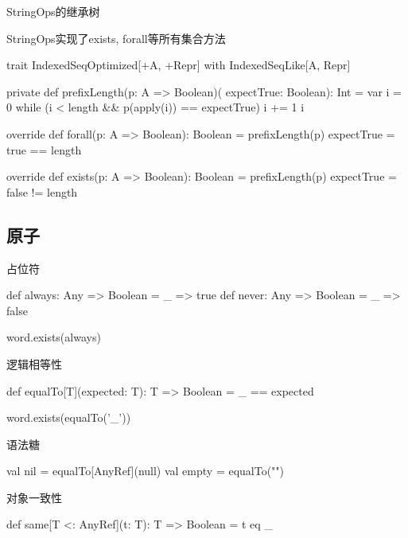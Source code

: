 \begin{frame}[fragile]{StringOps的继承树}
 \begin{block}{StringOps实现了exists, forall等所有集合方法}
  \begin{scala}
trait IndexedSeqOptimized[+A, +Repr] with IndexedSeqLike[A, Repr] {  
  private def prefixLength(p: A => Boolean)(
    expectTrue: Boolean): Int = {
    var i = 0
    while (i < length && p(apply(i)) == expectTrue) i += 1
    i
  }

  override def forall(p: A => Boolean): Boolean = 
    prefixLength(p) { expectTrue = true } == length
  
  override def exists(p: A => Boolean): Boolean = 
    prefixLength(p) { expectTrue = false } != length
}
  \end{scala}
 \end{block}
\end{frame}

\subsection{原子}

\begin{frame}[fragile]{占位符}
  \begin{scala}
def always: Any => Boolean = _ => true
def never:  Any => Boolean = _ => false  

word.exists(always)
  \end{scala}
\end{frame}

\begin{frame}[fragile]{逻辑相等性}
  \begin{scala}
def equalTo[T](expected: T): T => Boolean = _ == expected

word.exists(equalTo('_'))
  \end{scala}
\end{frame}

\begin{frame}[fragile]{语法糖}
  \begin{scala}
val nil   = equalTo[AnyRef](null)
val empty = equalTo("")
  \end{scala}
\end{frame}

\begin{frame}[fragile]{对象一致性}
  \begin{scala}
def same[T <: AnyRef](t: T): T => Boolean = t eq _
  \end{scala}
\end{frame}

